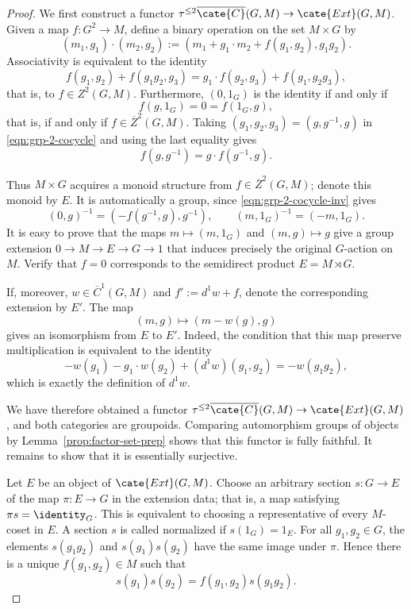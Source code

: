 \begin{proof}
	We first construct a functor
	$\tau^{\leq2}\overline{\cate{C}}(G,M)\to\cate{Ext}(G,M)$. Given a map
	$f:G^2\to M$, define a binary operation on the set $M\times G$ by
	\[ (m_1,g_1)\cdot(m_2,g_2):=
	\left(m_1+g_1\cdot m_2+f(g_1,g_2),g_1g_2\right). \]
	Associativity is equivalent to the identity
	\begin{equation}\label{eqn:grp-2-cocycle}
		f(g_1,g_2)+f(g_1g_2,g_3)
		=g_1\cdot f(g_2,g_3)+f(g_1,g_2g_3),
	\end{equation}
	that is, to $f\in Z^2(G,M)$. Furthermore, $(0,1_G)$ is the identity if
	and only if
	\[ f(g,1_G)=0=f(1_G,g), \]
	that is, if and only if $f\in\overline{Z}^2(G,M)$. Taking
	$(g_1,g_2,g_3)=(g,g^{-1},g)$ in \eqref{eqn:grp-2-cocycle} and using the
	last equality gives
	\begin{equation}\label{eqn:grp-2-cocycle-inv}
		f(g,g^{-1})=g\cdot f(g^{-1},g).
	\end{equation}

	Thus $M\times G$ acquires a monoid structure from
	$f\in\overline{Z}^2(G,M)$; denote this monoid by $E$. It is automatically
	a group, since \eqref{eqn:grp-2-cocycle-inv} gives
	\[ (0,g)^{-1}=\left(-f(g^{-1},g),g^{-1}\right),\qquad
	(m,1_G)^{-1}=(-m,1_G). \]
	It is easy to prove that the maps $m\mapsto(m,1_G)$ and $(m,g)\mapsto g$
	give a group extension $0\to M\to E\to G\to1$ that induces precisely the
	original $G$-action on $M$. Verify that $f=0$ corresponds to the
	semidirect product $E=M\rtimes G$.

	If, moreover, $w\in\overline{C}^1(G,M)$ and $f':=d^1w+f$, denote the
	corresponding extension by $E'$. The map
	\[ (m,g)\mapsto(m-w(g),g) \]
	gives an isomorphism from $E$ to $E'$. Indeed, the condition that this
	map preserve multiplication is equivalent to the identity
	\[ -w(g_1)-g_1\cdot w(g_2)+(d^1w)(g_1,g_2)=-w(g_1g_2), \]
	which is exactly the definition of $d^1w$.

	We have therefore obtained a functor
	$\tau^{\leq2}\overline{\cate{C}}(G,M)\to\cate{Ext}(G,M)$, and both
	categories are groupoids. Comparing automorphism groups of objects by
	Lemma~\ref{prop:factor-set-prep} shows that this functor is fully
	faithful. It remains to show that it is essentially surjective.

	Let $E$ be an object of $\cate{Ext}(G,M)$. Choose an arbitrary section
	$s:G\to E$ of the map $\pi:E\to G$ in the extension data; that is, a map
	satisfying $\pi s=\identity_G$. This is equivalent to choosing a
	representative of every $M$-coset in $E$. A section $s$ is called
	normalized if $s(1_G)=1_E$. For all $g_1,g_2\in G$, the elements
	$s(g_1g_2)$ and $s(g_1)s(g_2)$ have the same image under $\pi$. Hence
	there is a unique $f(g_1,g_2)\in M$ such that
	\[ s(g_1)s(g_2)=f(g_1,g_2)s(g_1g_2). \]


\end{proof}
